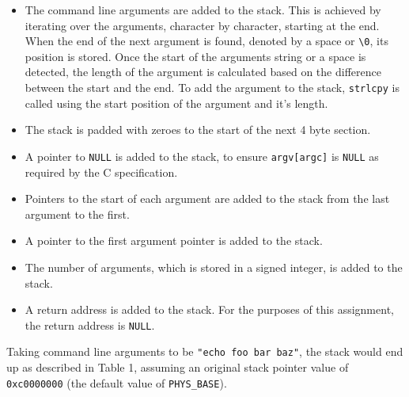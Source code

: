 \documentclass{article}
\begin{document}
\begin{itemize}
    \item The command line arguments are added to the stack. This is achieved by iterating over the arguments, character by character, starting at the end. When the end of the next argument is found, denoted by a space or \verb!\0!, its position is stored. Once the start of the arguments string or a space is detected, the length of the argument is calculated based on the difference between the start and the end. To add the argument to the stack, \verb!strlcpy! is called using the start position of the argument and it's length.

    \item The stack is padded with zeroes to the start of the next 4 byte section.

    \item A pointer to \verb!NULL! is added to the stack, to ensure \verb!argv[argc]! is  \verb!NULL! as required by the C specification.

    \item Pointers to the start of each argument are added to the stack from the last argument to the first.

    \item A pointer to the first argument pointer is added to the stack.

    \item The number of arguments, which is stored in a signed integer, is added to the stack.

    \item A return address is added to the stack. For the purposes of this assignment, the return address is \verb!NULL!.
\end{itemize}

Taking command line arguments to be \verb!"echo foo bar baz"!, the stack would end up as described in Table 1, assuming an original stack pointer value of \verb!0xc0000000! (the default value of \verb!PHYS_BASE!).

\newpage
\end{document}

